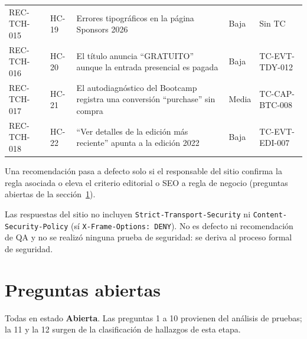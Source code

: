 \documentclass[11pt,a4paper]{article}
\begin{document}
{\begin{xltabular}{\textwidth}{@{}l l X l >{\raggedright\arraybackslash}p{0.27\textwidth}@{}}
REC-TCH-015 & HC-19 & Errores tipográficos en la página Sponsors 2026 & Baja & Sin TC \\
REC-TCH-016 & HC-20 & El título anuncia ``GRATUITO'' aunque la entrada presencial es pagada & Baja & TC-EVT-TDY-012 \\
REC-TCH-017 & HC-21 & El autodiagnóstico del Bootcamp registra una conversión ``purchase'' sin compra & Media & TC-CAP-BTC-008 \\
REC-TCH-018 & HC-22 & ``Ver detalles de la edición más reciente'' apunta a la edición 2022 & Baja & TC-EVT-EDI-007 \\
\bottomrule
\end{xltabular}
}

Una recomendación pasa a defecto solo si el responsable del sitio confirma la regla asociada o
eleva el criterio editorial o SEO a regla de negocio (preguntas abiertas de la sección~\ref{sec:preguntas}).

\begin{infobox}
\raggedright
Las respuestas del sitio no incluyen \texttt{Strict-Transport-Security} ni
\texttt{Content-Security-Policy} (sí \texttt{X-Frame-Options: DENY}). No es defecto ni recomendación
de QA y no se realizó ninguna prueba de seguridad: se deriva al proceso formal de seguridad.
\end{infobox}

\section{Preguntas abiertas}\label{sec:preguntas}

Todas en estado \textbf{Abierta}. Las preguntas 1 a 10 provienen del análisis de pruebas; la 11 y la
12 surgen de la clasificación de hallazgos de esta etapa.
\end{document}
